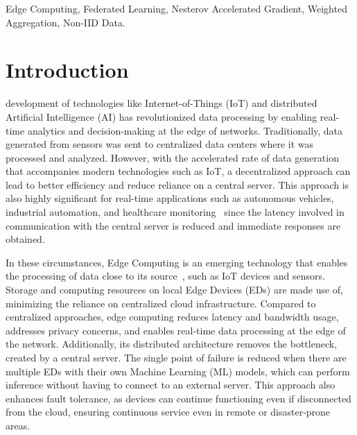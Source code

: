 \documentclass[journal]{IEEEtran}
\begin{document}
\begin{IEEEkeywords}
Edge Computing, Federated Learning, Nesterov Accelerated Gradient, Weighted Aggregation, Non-IID Data.
\end{IEEEkeywords}

\section{Introduction}
 development of technologies like Internet-of-Things (IoT) and distributed Artificial Intelligence (AI) has revolutionized data processing by enabling real-time analytics and decision-making at the edge of networks. Traditionally, data generated from sensors was sent to centralized data centers where it was processed and analyzed. However, with the accelerated rate of data generation that accompanies modern technologies such as IoT, a decentralized approach can lead to better efficiency and reduce reliance on a central server. This approach is also highly significant for real-time applications such as autonomous vehicles, industrial automation, and healthcare monitoring~\cite{intro} since the latency involved in communication with the central server is reduced and immediate responses are obtained.

In these circumstances, Edge Computing is an emerging technology that enables the processing of data close to its source~\cite{edge-ai-driven}, such as IoT devices and sensors. Storage and computing resources on local Edge Devices (EDs) are made use of, minimizing the reliance on centralized cloud infrastructure. Compared to centralized approaches, edge computing reduces latency and bandwidth usage, addresses privacy concerns, and enables real-time data processing at the edge of the network. Additionally, its distributed architecture removes the bottleneck, created by a central server. The single point of failure is reduced when there are multiple EDs with their own Machine Learning (ML) models, which can perform inference without having to connect to an external server. This approach also enhances fault tolerance, as devices can continue functioning even if disconnected from the cloud, ensuring continuous service even in remote or disaster-prone areas.
\end{document}
